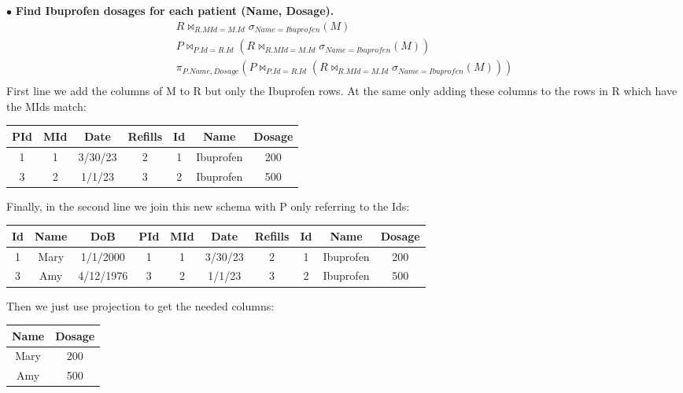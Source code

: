 \documentclass[twoside]{article}
\begin{document}
$\bullet$ \textbf{Find Ibuprofen dosages for each patient (Name, Dosage).}
\begin{gather*}
    R \bowtie_{R.MId=M.Id} \sigma_{Name=Ibuprofen}(M) \\
    P \bowtie_{P.Id=R.Id}(R \bowtie_{R.MId=M.Id} \sigma_{Name=Ibuprofen}(M)) \\
    \pi_{P.Name, Dosage}(P \bowtie_{P.Id=R.Id}(R \bowtie_{R.MId=M.Id} 
    \sigma_{Name=Ibuprofen}(M))) \\
\end{gather*}
First line we add the columns of M to R but only the Ibuprofen rows. At the same
only adding these columns to the rows in R which have the MIds match: 
\begin{table}[H]
    \centering
    \begin{tabular}{c|c|c|c|c|c|c}
        PId & MId & Date & Refills & Id & Name & Dosage \\
        \hline
        1 & 1 & 3/30/23 & 2 & 1 & Ibuprofen & 200 \\
        3 & 2 & 1/1/23 & 3 & 2 & Ibuprofen & 500 \\
    \end{tabular}
\end{table}
Finally, in the second line we join this new schema with P only 
referring to the Ids:
\begin{table}[H]
    \centering
    \begin{tabular}{c|c|c|c|c|c|c|c|c|c}
        Id & Name & DoB & PId & MId & Date & Refills & Id & Name & Dosage \\
        \hline
        1 & Mary & 1/1/2000 & 1 & 1 & 3/30/23 & 2 & 1 & Ibuprofen & 200 \\
        3 & Amy &  4/12/1976 & 3 & 2 & 1/1/23 & 3 & 2 & Ibuprofen & 500 \\
    \end{tabular}
\end{table}
Then we just use projection to get the needed columns:
\begin{table}[H]
    \centering
    \begin{tabular}{c|c}
        Name & Dosage \\
        \hline
        Mary & 200 \\
        Amy & 500 \\
    \end{tabular}
\end{table}
\end{document}
